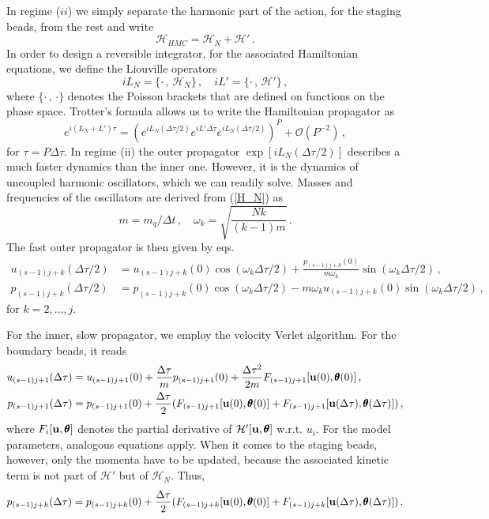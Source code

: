\documentclass[11pt, a4paper]{article}
\newcommand{\vc}[1]{{\bf #1 }}
\begin{document}
In regime ($ii$) we simply separate the harmonic part of the action, for the staging beads, from the rest and write
\begin{equation}
  \mathcal H_{HMC}=\mathcal H_N + \mathcal H'\,.
\end{equation}
In order to design a reversible integrator, for the associated Hamiltonian equations, we define the Liouville operators
\begin{equation}
  iL_N=\{\cdot\,,\,\mathcal H_N\}\,,\quad
  iL'=\{\cdot\,,\,\mathcal H'\}\,,
\end{equation}
where $\{\cdot\,,\,\cdot\}$ denotes the Poisson brackets that are defined on functions on the phase space.
Trotter's formula allows us to write the Hamiltonian propagator as
\begin{equation}
  e^{i(L_N+L')\tau}
  =
  (e^{iL_N(\Delta\tau/2)}e^{iL'\Delta\tau}e^{iL_N(\Delta\tau/2)})^P
  +
  \mathcal O(P^{-2})\,,
\end{equation}
for $\tau =P\Delta \tau$.
In regime (ii) the outer propagator $\exp[iL_N(\Delta \tau/2)]$ describes a much faster dynamics than the inner one.
However, it is the dynamics of uncoupled harmonic oscillators, which we can readily solve.
Masses and frequencies of the oscillators are derived from (\ref{H_N}) as
\begin{equation}
  m=m_q/\Delta t\,,\quad
  \omega_k=\sqrt{\frac{Nk}{(k-1)m}}\,.
\end{equation}
The fast outer propagator is then given by eqs.
\begin{align}
  u_{(s-1)j+k}(\Delta\tau/2)
  &=
  u_{(s-1)j+k}(0)\cos(\omega_k\Delta\tau/2)
  +
  \frac{p_{(s-1)j+k}(0)}{m\omega_k}\sin(\omega_k\Delta\tau/2)\,,\\
  p_{(s-1)j+k}(\Delta\tau/2)
  &=
  p_{(s-1)j+k}(0)\cos(\omega_k\Delta\tau/2)
  -
  m\omega_k u_{(s-1)j+k}(0) \sin(\omega_k\Delta\tau/2)\,,
\end{align}
for $k=2,\dots,j$.

For the inner, slow propagator, we employ the velocity Verlet algorithm.
For the boundary beads, it reads
\begin{align}
  u_{(s-1)j+1}(\Delta\tau)
  &=
  u_{(s-1)j+1}(0)
  +
  \frac{\Delta\tau}{m} p_{(s-1)j+1}(0)
  +
  \frac{\Delta \tau^2}{2m}
  F_{(s-1)j+1}[\vc u(0),{\pmb\theta}(0)]\,,\\
  p_{(s-1)j+1}(\Delta\tau)
  &=
  p_{(s-1)j+1}(0)
  +
  \frac{\Delta\tau}{2}
  (
  F_{(s-1)j+1}[\vc u(0),{\pmb\theta}(0)]
  +
  F_{(s-1)j+1}[\vc u(\Delta\tau),{\pmb\theta}(\Delta\tau)]
  )\,,
\end{align}
where $F_i[\vc u,{\pmb\theta}]$ denotes the partial derivative of $\mathcal H'[\vc u,{\pmb\theta}]$ w.r.t. $u_i$.
For the model parameters, analogous equations apply.
When it comes to the staging beads, however, only the momenta have to be updated, because the associated kinetic term is not part of $\mathcal H'$ but of $\mathcal H_N$.
Thus,
\begin{equation}
  p_{(s-1)j+k}(\Delta\tau)
  =
  p_{(s-1)j+k}(0)
  +
  \frac{\Delta\tau}{2}
  (
  F_{(s-1)j+k}[\vc u(0),{\pmb\theta}(0)]
  +
  F_{(s-1)j+k}[\vc u(\Delta\tau),{\pmb\theta}(\Delta\tau)]
  )
  \,.
\end{equation}
\end{document}
